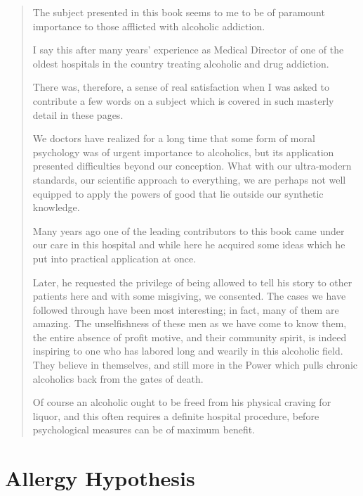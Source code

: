 \begin{quote}
The subject presented in this book seems to me to be of paramount importance to those afflicted with alcoholic addiction.

I say this after many years' experience as Medical Director of one of the oldest hospitals in the country treating alcoholic and drug addiction.

There was, therefore, a sense of real satisfaction when I was asked to contribute a few words on a subject which is covered in such masterly detail in these pages.

We doctors have realized for a long time that some form of moral psychology was of urgent importance to alcoholics, but its application presented difficulties beyond our conception. 
What with our ultra-modern standards, our scientific approach to everything, we are perhaps not well equipped to apply the powers of good that lie outside our synthetic knowledge.

Many years ago one of the leading contributors to this book came under our care in this hospital and while here he acquired some ideas which he put into practical application at once.

Later, he requested the privilege of being allowed to tell his story to other patients here and with some misgiving, we consented. 
The cases we have followed through have been most interesting; 
in fact, many of them are amazing. 
The unselfishness of these men as we have come to know them, the entire absence of profit motive, and their community spirit, is indeed inspiring to one who has labored long and wearily in this alcoholic field. 
They believe in themselves, and still more in the Power which pulls chronic alcoholics back from the gates of death.

Of course an alcoholic ought to be freed from his physical craving for liquor, and this often requires a definite hospital procedure, before psychological measures can be of maximum benefit.
\end{quote}


\section{Allergy Hypothesis}

